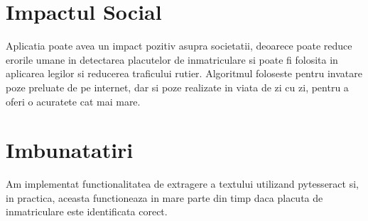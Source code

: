 \documentclass[12pt]{article}
\begin{document}
\section*{Impactul Social}
Aplicatia poate avea un impact pozitiv asupra societatii, deoarece poate reduce erorile umane in detectarea placutelor de inmatriculare si poate fi folosita in aplicarea legilor si reducerea traficului rutier. Algoritmul foloseste pentru invatare poze preluate de pe internet, dar si poze realizate in viata de zi cu zi, pentru a oferi o acuratete cat mai mare.

\section*{Imbunatatiri}
Am implementat functionalitatea de extragere a textului utilizand pytesseract si, in practica, aceasta functioneaza in mare parte din timp daca placuta de inmatriculare este identificata corect.
\end{document}
